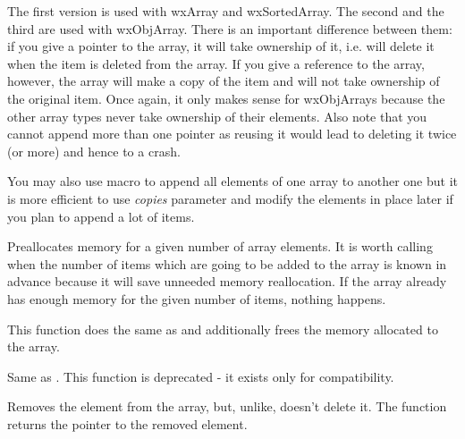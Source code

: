 The first version is used with wxArray and wxSortedArray. The second and the
third are used with wxObjArray. There is an important difference between
them: if you give a pointer to the array, it will take ownership of it, i.e.
will delete it when the item is deleted from the array. If you give a reference
to the array, however, the array will make a copy of the item and will not take
ownership of the original item. Once again, it only makes sense for wxObjArrays
because the other array types never take ownership of their elements. Also note
that you cannot append more than one pointer as reusing it would lead to
deleting it twice (or more) and hence to a crash.

You may also use  macro to append all
elements of one array to another one but it is more efficient to use 
{\it copies} parameter and modify the elements in place later if you plan to
append a lot of items.

\label{wxarrayalloc}


Preallocates memory for a given number of array elements. It is worth calling
when the number of items which are going to be added to the array is known in
advance because it will save unneeded memory reallocation. If the array already
has enough memory for the given number of items, nothing happens.

\label{wxarrayclear}


This function does the same as  and additionally
frees the memory allocated to the array.

\label{wxarraycount}


Same as . This function is deprecated -
it exists only for compatibility.

\label{wxobjarraydetach}


Removes the element from the array, but, unlike, 
 doesn't delete it. The function returns the
pointer to the removed element.

\label{wxarrayempty}

